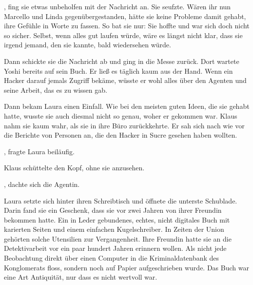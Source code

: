 \par

, fing sie etwas unbeholfen mit der Nachricht an.  Sie seufzte. Wären ihr nun Marcello und Linda gegenübergestanden, hätte sie keine Probleme damit gehabt, ihre Gefühle in Worte zu fassen. So bat sie nur:  Sie hoffte und war sich doch nicht so sicher. Selbst, wenn alles gut laufen würde, wäre es längst nicht klar, dass sie irgend jemand, den sie kannte, bald wiedersehen würde.

\par

Dann schickte sie die Nachricht ab und ging in die Messe zurück. Dort wartete Yoshi bereits auf sein Buch. Er ließ es täglich kaum aus der Hand. Wenn ein Hacker darauf jemals Zugriff bekäme, wüsste er wohl alles über den Agenten und seine Arbeit, das es zu wissen gab.

\par

Dann bekam Laura einen Einfall. Wie bei den meisten guten Ideen, die sie gehabt hatte, wusste sie auch  diesmal nicht so genau, woher er gekommen war. Klaus nahm sie kaum wahr, als sie in ihre Büro zurückkehrte. Er sah sich nach wie vor die Berichte von Personen an, die den Hacker in Sucre gesehen haben wollten.

\par

, fragte Laura beiläufig.

\par

Klaus schüttelte den Kopf, ohne sie anzusehen. 

\par

, dachte sich die Agentin. 

\par

Laura setzte sich hinter ihren Schreibtisch und öffnete die unterste Schublade. Darin fand sie ein Geschenk, dass sie vor zwei Jahren von ihrer Freundin bekommen hatte. Ein in Leder gebundenes, echtes, nicht digitales Buch mit karierten Seiten und einem einfachen Kugelschreiber. In Zeiten der Union gehörten solche Utensilien zur Vergangenheit. Ihre Freundin hatte sie an die Detektivarbeit vor ein paar hundert Jahren erinnern wollen. Als nicht jede Beobachtung direkt über einen Computer in die Kriminaldatenbank des Konglomerats floss, sondern noch auf Papier aufgeschrieben wurde. Das Buch war eine Art Antiquität, nur dass es nicht wertvoll war.

